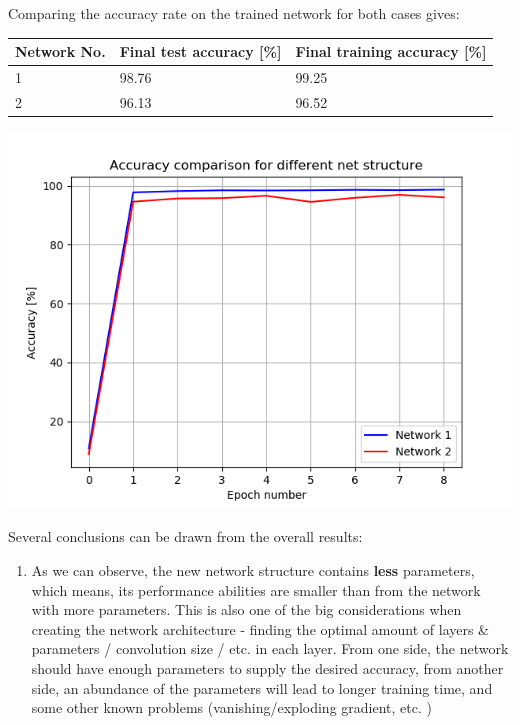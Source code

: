 \documentclass[a4paper]{iacas}
\begin{document}
Comparing the accuracy rate on the trained network for both cases gives:

\begin{table}[]
\begin{tabular}{|l|l|l|}
\hline
Network No. & Final test accuracy {[}\%{]} & Final training accuracy {[}\%{]} \\ \hline
1           & 98.76                        & 99.25                            \\ \hline
2           & 96.13                        & 96.52                            \\ \hline
\end{tabular}
\end{table}

\vskip 0.1in
\begin{minipage}{\linewidth}
	\includegraphics[scale=0.8]{hw2_py/results/_14_11_31/comparison/accuracy_1_5.png}
	\label{fig_18}
\end{minipage}
\vskip 0.1in
Several conclusions can be drawn from the overall results:

\begin{enumerate}
\item As we can observe, the new network structure contains \textbf{less} parameters, which means, its performance abilities are smaller than from the network with more parameters. This is also one of the big considerations when creating the network architecture - finding the optimal amount of layers \& parameters / convolution size / etc. in each layer. From one side, the network should have enough parameters to supply the desired accuracy, from another side, an abundance of the parameters will lead to longer training time, and some other known problems (vanishing/exploding gradient, etc. ) 
\end{enumerate}
\end{document}
